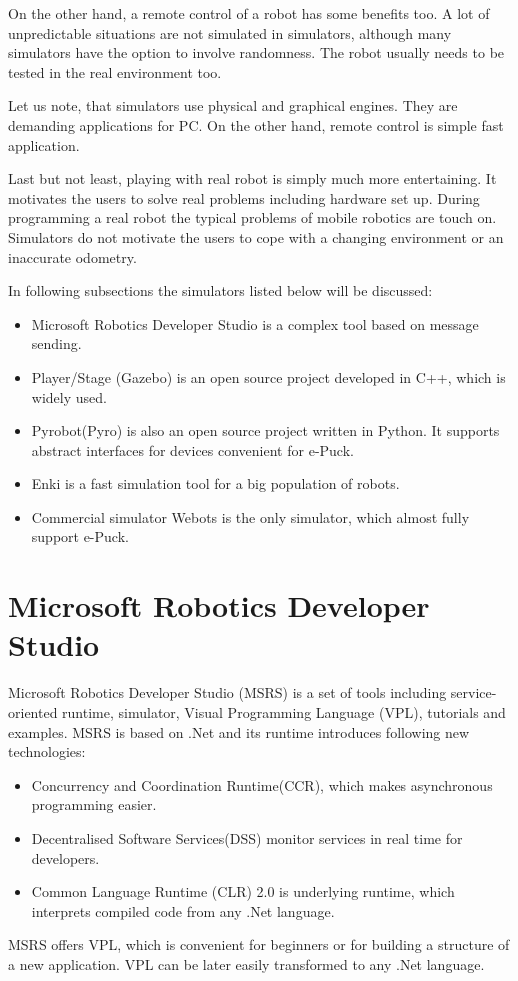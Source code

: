 	On the other hand, a remote control of a robot has some benefits too. 
	A lot of unpredictable situations are not simulated in simulators, although 
	many simulators have the option to involve randomness. The robot usually
	needs to be tested in the real environment too.
	
	Let us note, that simulators use physical and graphical engines. They are demanding applications
	for PC. 
	On the other hand, remote control is simple fast application.
	
	Last but not least, playing with real robot is simply much more entertaining. 	
	It motivates the users to solve real problems including hardware set up. 
	During programming a real robot the typical problems of mobile robotics are touch on.
	Simulators do not motivate the users to cope with a changing environment or an inaccurate odometry.
	
	In following subsections the simulators listed below will be discussed:
	\begin{itemize}
	\item Microsoft Robotics Developer Studio\cite{msrs} is a complex tool based on message sending.
	\item Player/Stage\cite{player} (Gazebo) is an open source project developed in C++, which is widely used.
	\item Pyrobot(Pyro)\cite{pyro} is also an open source project written in Python. It supports abstract
	interfaces for devices convenient for e-Puck.
	\item Enki\cite{enki} is a fast simulation tool for a big population of robots.
	\item Commercial simulator Webots\cite{webots} is the only simulator, which almost fully support e-Puck. 
	\end{itemize}
\section{Microsoft Robotics Developer Studio\cite{msrs}} 
	Microsoft Robotics Developer Studio (MSRS) is a set of tools including service-oriented runtime,
	simulator, Visual Programming Language (VPL),
	tutorials and examples. MSRS is based on .Net and its runtime introduces following new technologies:
	\begin{itemize}
	\item Concurrency and Coordination Runtime(CCR), which makes asynchronous programming easier.
	\item Decentralised Software Services(DSS) monitor services in real time for developers.
	\item Common Language Runtime (CLR) 2.0 is underlying runtime, 
		which interprets compiled code from any .Net language.
	\end{itemize}	
	MSRS offers VPL, which is convenient for beginners or for building a structure of a new application.
	VPL can be later easily transformed to any .Net language.
	
